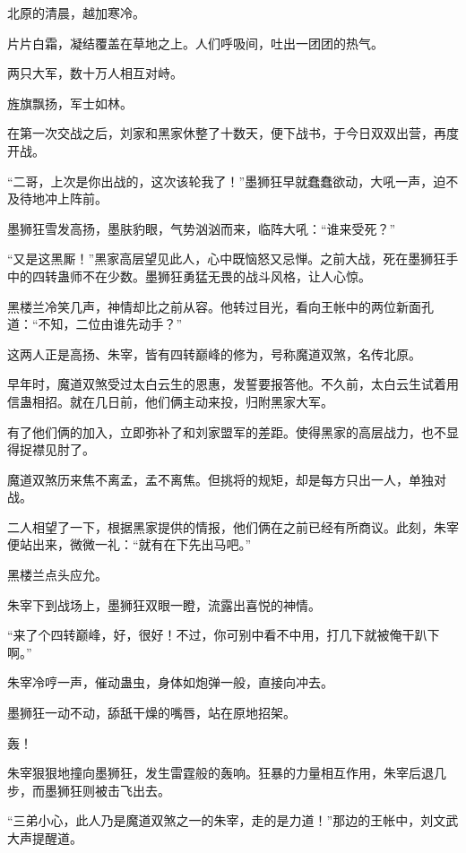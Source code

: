 
\begin{this_body}

北原的清晨，越加寒冷。

片片白霜，凝结覆盖在草地之上。人们呼吸间，吐出一团团的热气。

两只大军，数十万人相互对峙。

旌旗飘扬，军士如林。

在第一次交战之后，刘家和黑家休整了十数天，便下战书，于今日双双出营，再度开战。

“二哥，上次是你出战的，这次该轮我了！”墨狮狂早就蠢蠢欲动，大吼一声，迫不及待地冲上阵前。

墨狮狂雪发高扬，墨肤豹眼，气势汹汹而来，临阵大吼：“谁来受死？”

“又是这黑厮！”黑家高层望见此人，心中既恼怒又忌惮。之前大战，死在墨狮狂手中的四转蛊师不在少数。墨狮狂勇猛无畏的战斗风格，让人心惊。

黑楼兰冷笑几声，神情却比之前从容。他转过目光，看向王帐中的两位新面孔道：“不知，二位由谁先动手？”

这两人正是高扬、朱宰，皆有四转巅峰的修为，号称魔道双煞，名传北原。

早年时，魔道双煞受过太白云生的恩惠，发誓要报答他。不久前，太白云生试着用信蛊相招。就在几日前，他们俩主动来投，归附黑家大军。

有了他们俩的加入，立即弥补了和刘家盟军的差距。使得黑家的高层战力，也不显得捉襟见肘了。

魔道双煞历来焦不离孟，孟不离焦。但挑将的规矩，却是每方只出一人，单独对战。

二人相望了一下，根据黑家提供的情报，他们俩在之前已经有所商议。此刻，朱宰便站出来，微微一礼：“就有在下先出马吧。”

黑楼兰点头应允。

朱宰下到战场上，墨狮狂双眼一瞪，流露出喜悦的神情。

“来了个四转巅峰，好，很好！不过，你可别中看不中用，打几下就被俺干趴下啊。”

朱宰冷哼一声，催动蛊虫，身体如炮弹一般，直接向冲去。

墨狮狂一动不动，舔舐干燥的嘴唇，站在原地招架。

轰！

朱宰狠狠地撞向墨狮狂，发生雷霆般的轰响。狂暴的力量相互作用，朱宰后退几步，而墨狮狂则被击飞出去。

“三弟小心，此人乃是魔道双煞之一的朱宰，走的是力道！”那边的王帐中，刘文武大声提醒道。


\end{this_body}
